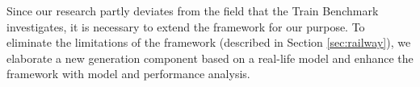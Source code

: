 Since our research partly deviates from the field that the Train Benchmark investigates, it is necessary to extend the framework for our purpose. To eliminate the limitations of the framework (described in Section \ref{sec:railway}), we elaborate a new generation component based on a real-life model and enhance the framework with model and performance analysis.
